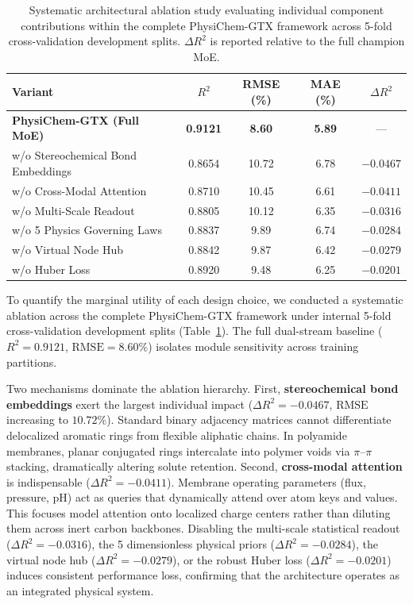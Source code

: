 \documentclass[11pt]{article}
\newcommand{\rsq}{R^{2}}
\begin{document}
\begin{table}[htbp]
\centering
\caption{Systematic architectural ablation study evaluating individual component contributions within the complete PhysiChem-GTX framework across 5-fold cross-validation development splits. $\Delta \rsq$ is reported relative to the full champion MoE.}
\label{tab:ablation}
\begin{tabular}{lcccc}
\toprule
Variant & $\rsq$ & RMSE (\%) & MAE (\%) & $\Delta \rsq$ \\
\midrule
\textbf{PhysiChem-GTX (Full MoE)} & \textbf{0.9121} & \textbf{8.60} & \textbf{5.89} & --- \\
w/o Stereochemical Bond Embeddings & 0.8654 & 10.72 & 6.78 & $-0.0467$ \\
w/o Cross-Modal Attention & 0.8710 & 10.45 & 6.61 & $-0.0411$ \\
w/o Multi-Scale Readout & 0.8805 & 10.12 & 6.35 & $-0.0316$ \\
w/o 5 Physics Governing Laws & 0.8837 & 9.89 & 6.74 & $-0.0284$ \\
w/o Virtual Node Hub & 0.8842 & 9.87 & 6.42 & $-0.0279$ \\
w/o Huber Loss & 0.8920 & 9.48 & 6.25 & $-0.0201$ \\
\bottomrule
\end{tabular}%

\end{table}

To quantify the marginal utility of each design choice, we conducted a systematic ablation across the complete PhysiChem-GTX framework under internal 5-fold cross-validation development splits (Table~\ref{tab:ablation}). The full dual-stream baseline ($\rsq = 0.9121$, $\mathrm{RMSE} = 8.60\%$) isolates module sensitivity across training partitions.

Two mechanisms dominate the ablation hierarchy. First, \textbf{stereochemical bond embeddings} exert the largest individual impact ($\Delta \rsq = -0.0467$, $\mathrm{RMSE}$ increasing to $10.72\%$). Standard binary adjacency matrices cannot differentiate delocalized aromatic rings from flexible aliphatic chains. In polyamide membranes, planar conjugated rings intercalate into polymer voids via $\pi$--$\pi$ stacking, dramatically altering solute retention. Second, \textbf{cross-modal attention} is indispensable ($\Delta \rsq = -0.0411$). Membrane operating parameters (flux, pressure, pH) act as queries that dynamically attend over atom keys and values. This focuses model attention onto localized charge centers rather than diluting them across inert carbon backbones. Disabling the multi-scale statistical readout ($\Delta \rsq = -0.0316$), the 5 dimensionless physical priors ($\Delta \rsq = -0.0284$), the virtual node hub ($\Delta \rsq = -0.0279$), or the robust Huber loss ($\Delta \rsq = -0.0201$) induces consistent performance loss, confirming that the architecture operates as an integrated physical system.
\end{document}
